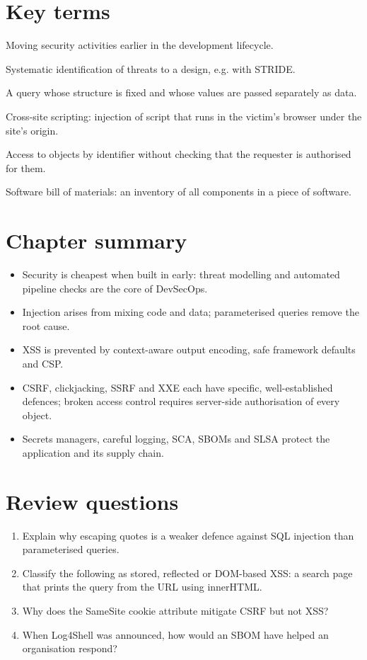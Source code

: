 \section*{Key terms}
\begin{description}[style=nextline,leftmargin=1.2em]
  \item[Shift-left] Moving security activities earlier in the development lifecycle.
  \item[Threat modelling] Systematic identification of threats to a design, e.g. with STRIDE.
  \item[Parameterised query] A query whose structure is fixed and whose values are passed separately as data.
  \item[XSS] Cross-site scripting: injection of script that runs in the victim's browser under the site's origin.
  \item[IDOR / BOLA] Access to objects by identifier without checking that the requester is authorised for them.
  \item[SBOM] Software bill of materials: an inventory of all components in a piece of software.
\end{description}

\section*{Chapter summary}
\begin{itemize}
  \item Security is cheapest when built in early: threat modelling and automated pipeline checks are the core of DevSecOps.
  \item Injection arises from mixing code and data; parameterised queries remove the root cause.
  \item XSS is prevented by context-aware output encoding, safe framework defaults and CSP.
  \item CSRF, clickjacking, SSRF and XXE each have specific, well-established defences; broken access control requires server-side authorisation of every object.
  \item Secrets managers, careful logging, SCA, SBOMs and SLSA protect the application and its supply chain.
\end{itemize}

\section*{Review questions}
\begin{enumerate}
  \item Explain why escaping quotes is a weaker defence against SQL injection than parameterised queries.
  \item Classify the following as stored, reflected or DOM-based XSS: a search page that prints the query from the URL using innerHTML.
  \item Why does the SameSite cookie attribute mitigate CSRF but not XSS?
  \item When Log4Shell was announced, how would an SBOM have helped an organisation respond?
\end{enumerate}
